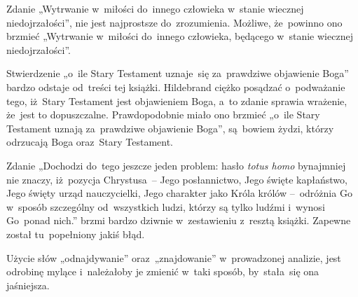 \documentclass[a4paper,11pt]{article}
\begin{document}










\newpage





\noindent
{} Zdanie „Wytrwanie w~miłości do~innego człowieka w~stanie
wiecznej niedojrzałości”, nie jest najprostsze do~zrozumienia. Możliwe,
że~powinno ono brzmieć „Wytrwanie w~miłości do~innego człowieka, będącego
w~stanie wiecznej niedojrzałości”.

\vspace{\spaceFour}





\noindent
{} Stwierdzenie „o~ile Stary Testament uznaje~się za~prawdziwe
objawienie Boga” bardzo odstaje od~treści tej książki. Hildebrand ciężko
posądzać o~podważanie tego, iż~Stary Testament jest objawieniem Boga, a~to
zdanie sprawia wrażenie, że~jest to dopuszczalne. Prawdopodobnie miało ono
brzmieć „o~ile Stary Testament uznają za~prawdziwe objawienie Boga”,
są~bowiem żydzi, którzy odrzucają Boga oraz~Stary Testament.

\vspace{\spaceFour}





\noindent
{} Zdanie „Dochodzi do~tego jeszcze jeden problem: hasło
\textit{totus homo} bynajmniej nie znaczy, iż~pozycja Chrystusa~--
Jego posłannictwo, Jego święte kapłaństwo, Jego święty urząd
nauczycielki, Jego charakter jako Króla królów --~odróżnia Go w~sposób
szczególny od~wszystkich ludzi, którzy są tylko ludźmi i~wynosi
Go~ponad nich.” brzmi bardzo dziwnie w~zestawieniu z~resztą książki.
Zapewne został tu~popełniony jakiś błąd.

\vspace{\spaceFour}





\noindent
{} Użycie słów „odnajdywanie” oraz~„znajdowanie” w~prowadzonej
analizie, jest odrobinę mylące i~należałoby je zmienić w~taki sposób,
by~stała~się ona jaśniejsza.
\end{document}
